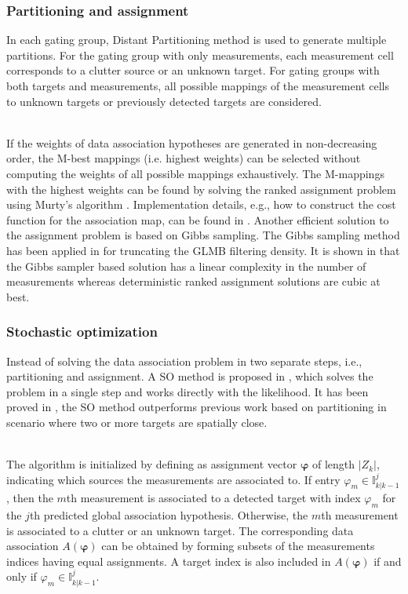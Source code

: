 \subsubsection{Partitioning and assignment}
In each gating group, Distant Partitioning method \cite{phdextended,phdextended2} is used to generate multiple partitions. For the gating group with only measurements, each measurement cell corresponds to a clutter source or an unknown target. For gating groups with both targets and measurements, all possible mappings of the measurement cells to unknown targets or previously detected targets are considered. 

~\\
If the weights of data association hypotheses are generated in non-decreasing order, the M-best mappings (i.e. highest weights) can be selected without computing the weights of all possible mappings exhaustively. The M-mappings with the highest weights can be found by solving the ranked assignment problem using Murty’s algorithm \cite{murty}. Implementation details, e.g., how to construct the cost function for the association map, can be found in \cite{pmbmpoint2}. Another efficient solution to the assignment problem is based on Gibbs sampling. The Gibbs sampling method has been applied in \cite{gibbsglmb} for truncating the GLMB filtering density. It is shown in \cite{gibbsglmb} that the Gibbs sampler based solution has a linear complexity in the number of measurements whereas deterministic ranked assignment solutions are cubic at best. 


\subsubsection{Stochastic optimization}
Instead of solving the data association problem in two separate steps, i.e., partitioning and assignment. A SO method is proposed in \cite{soextended}, which solves the problem in a single step and works directly with the likelihood. It has been proved in \cite{soextended}, the SO method outperforms previous work based on partitioning in scenario where two or more targets are spatially close. 

~\\
The algorithm is initialized by defining as assignment vector $\boldsymbol{\varphi}$ of length $|Z_k|$, indicating which sources the measurements are associated to. If entry $\varphi_m\in\mathbb{I}^j_{k|k-1}$, then the $m$th measurement is associated to a detected target with index $\varphi_m$ for the $j$th predicted global association hypothesis. Otherwise, the $m$th measurement is associated to a clutter or an unknown target. The corresponding data association $A(\boldsymbol{\varphi})$ can be obtained by forming subsets of the measurements indices having equal assignments. A target index is also included in $A(\boldsymbol{\varphi})$ if and only if $\varphi_m\in\mathbb{I}^j_{k|k-1}$. 

